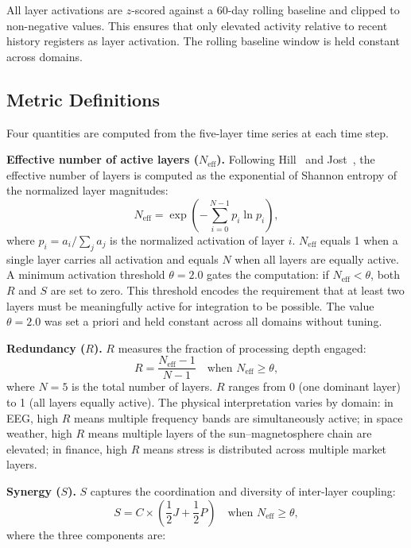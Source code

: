 \documentclass[aip,cha,reprint,amsmath,amssymb,final,floatfix]{revtex4-2}
\begin{document}
All layer activations are $z$-scored against a 60-day rolling baseline and clipped to non-negative values. This ensures that only elevated activity relative to recent history registers as layer activation. The rolling baseline window is held constant across domains.

\subsection{Metric Definitions}

Four quantities are computed from the five-layer time series at each time step.

\textbf{Effective number of active layers ($N_\text{eff}$).} Following Hill~\cite{hill1973} and Jost~\cite{jost2006}, the effective number of layers is computed as the exponential of Shannon entropy of the normalized layer magnitudes:
\begin{equation}
N_{\text{eff}} = \exp\left( -\sum_{i=0}^{N-1} p_i \ln p_i \right),
\end{equation}
where $p_i = a_i / \sum_j a_j$ is the normalized activation of layer $i$. $N_\text{eff}$ equals 1 when a single layer carries all activation and equals $N$ when all layers are equally active. A minimum activation threshold $\theta = 2.0$ gates the computation: if $N_\text{eff} < \theta$, both $R$ and $S$ are set to zero. This threshold encodes the requirement that at least two layers must be meaningfully active for integration to be possible. The value $\theta = 2.0$ was set a priori and held constant across all domains without tuning.

\textbf{Redundancy ($R$).} $R$ measures the fraction of processing depth engaged:
\begin{equation}
R = \frac{N_{\text{eff}} - 1}{N - 1} \quad \text{when } N_{\text{eff}} \geq \theta,
\end{equation}
where $N = 5$ is the total number of layers. $R$ ranges from 0 (one dominant layer) to 1 (all layers equally active). The physical interpretation varies by domain: in EEG, high $R$ means multiple frequency bands are simultaneously active; in space weather, high $R$ means multiple layers of the sun--magnetosphere chain are elevated; in finance, high $R$ means stress is distributed across multiple market layers.

\textbf{Synergy ($S$).} $S$ captures the coordination and diversity of inter-layer coupling:
\begin{equation}
S = C \times \left(\frac{1}{2} J + \frac{1}{2} P\right) \quad \text{when } N_{\text{eff}} \geq \theta,
\end{equation}
where the three components are:
\end{document}
